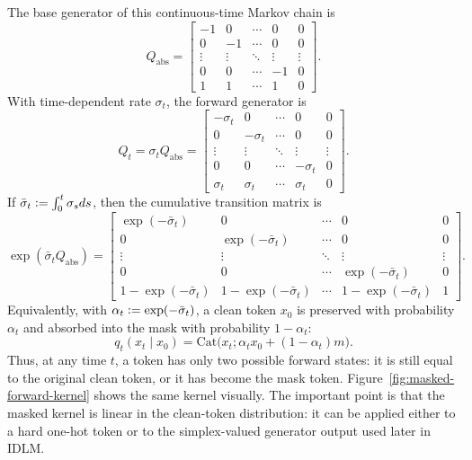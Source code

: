 \begin{reviewblock}
The base generator of this continuous-time Markov chain is
\begin{equation}
    Q_{\text{abs}} =
    \begin{bmatrix}
        -1 & 0 & \cdots & 0 & 0 \\
        0 & -1 & \cdots & 0 & 0 \\
        \vdots & \vdots & \ddots & \vdots & \vdots \\
        0 & 0 & \cdots & -1 & 0 \\
        1 & 1 & \cdots & 1 & 0
    \end{bmatrix}.
\end{equation}
With time-dependent rate $\sigma_t$, the forward generator is
\begin{equation}
    \label{eq: absorbing diffusion matrix}
    Q_t = \sigma_t Q_{\text{abs}} =
    \begin{bmatrix}
        -\sigma_t & 0 & \cdots & 0 & 0 \\
        0 & -\sigma_t & \cdots & 0 & 0 \\
        \vdots & \vdots & \ddots & \vdots & \vdots \\
        0 & 0 & \cdots & -\sigma_t & 0 \\
        \sigma_t & \sigma_t & \cdots & \sigma_t & 0
    \end{bmatrix}.
\end{equation}
If $\bar{\sigma}_t\vcentcolon=\int_0^t\sigma_sds$, then the cumulative
transition matrix is
\begin{equation}
    \exp(\bar{\sigma}_t Q_{\text{abs}}) =
    \begin{bmatrix}
        \exp(-\bar{\sigma}_t) & 0 & \cdots & 0 & 0 \\
        0 & \exp(-\bar{\sigma}_t) & \cdots & 0 & 0 \\
        \vdots & \vdots & \ddots & \vdots & \vdots \\
        0 & 0 & \cdots & \exp(-\bar{\sigma}_t) & 0 \\
        1 - \exp(-\bar{\sigma}_t) & 1 - \exp(-\bar{\sigma}_t) & \cdots & 1 - \exp(-\bar{\sigma}_t) & 1
    \end{bmatrix}.
\end{equation}
Equivalently, with $\alpha_t\vcentcolon=\exp(-\bar{\sigma}_t)$, a clean token
$x_0$ is preserved with probability $\alpha_t$ and absorbed into the mask with
probability $1-\alpha_t$:
\[
    q_t(x_t\mid x_0)
    =
    \mathrm{Cat}\bigl(x_t;\alpha_t x_0 + (1-\alpha_t)m\bigr).
\]
Thus, at any time $t$, a token has only two possible forward states: it is
still equal to the original clean token, or it has become the mask token.
Figure~\ref{fig:masked-forward-kernel} shows the same kernel visually. The
important point is that the masked kernel is linear in the clean-token
distribution: it can be applied either to a hard one-hot token or to the
simplex-valued generator output used later in IDLM.


\end{reviewblock}

